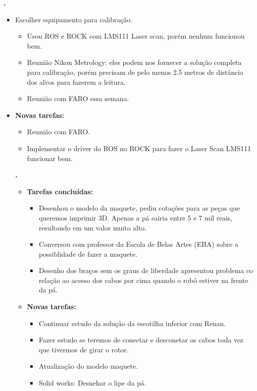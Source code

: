 \textbf{\gabriel.} 
	\begin{itemize}
		\item Escolher equipamento para calibração.
			\begin{itemize}  
				\item Usou ROS e ROCK com LMS111 Laser scan, porém nenhum funcionou bem.
				\item Reunião Nikon Metrology: eles podem nos fornecer a solução completa
				para calibração, porém precisam de pelo menos 2.5 metros de distância
				dos alvos para fazerem a leitura.
				\item Reunião com FARO essa semana.
			\end{itemize}
		
		\item \textbf{Novas tarefas:}
			\begin{itemize} 
				\item Reunião com FARO.
				\item Implementar o driver do ROS no ROCK para fazer o Laser Scan LMS111
				funcionar bem.
			\end{itemize}

					
			
   \textbf{.} 
	\begin{itemize}
		\item \textbf{Tarefas concluídas:}
			\begin{itemize}    
				\item Desenhou o modelo da maquete, pediu cotações para as peças que
				queremos imprimir 3D. Apenas a pá sairia entre 5 e 7 mil reais, resultando
				em um valor muito alto. 
				\item Conversou com professor da Escola de Belas Artes (EBA) sobre a
				possiblidade de fazer a maquete.
				\item Desenho dos braços sem os graus de liberdade apresentou problema co
				relação ao acesso dos cabos por cima quando o robô estiver na frente da pá.
				
			\end{itemize}
		
		\item \textbf{Novas tarefas:}
			\begin{itemize} 
			    \item Continuar estudo da solução da escotilha inferior com Renan.
			    \item Fazer estudo se teremos de conectar e desconetar os cabos toda vez
			    que tivermos de girar o rotor.
				\item Atualização do modelo maquete.
			    \item Solid works: Desnehar o lipe da pá.
			\end{itemize}
	\end{itemize}


\end{itemize}
